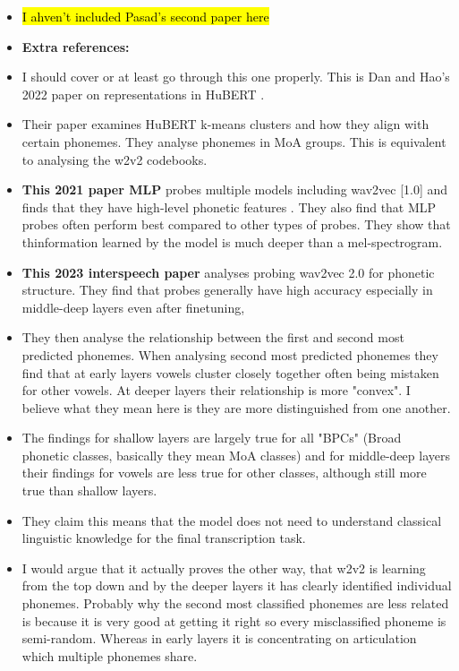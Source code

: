 \begin{itemize}
\iffalse
    \item \hl{I ahven't included Pasad's second paper here }\cite{pasad2023comparative}
    \item \textbf{Extra references:}
    \item I should cover or at least go through this one properly. This is Dan and Hao's 2022 paper on representations in HuBERT \cite{wells2022phonetic}.
    \item Their paper examines HuBERT k-means clusters and how they align with certain phonemes. They analyse phonemes in MoA groups. This is equivalent to analysing the w2v2 codebooks.
    \item \textbf{This 2021 paper MLP} probes multiple models including wav2vec [1.0] and finds that they have high-level phonetic features \cite{ma2021probing}. They also find that MLP probes often perform best compared to other types of probes. They show that thinformation learned by the model is much deeper than a mel-spectrogram.
    \item \textbf{This 2023 interspeech paper} \cite{ten2023phonemic} analyses probing wav2vec 2.0 for phonetic structure. They find that probes generally have high accuracy especially in middle-deep layers even after finetuning,
    \item They then analyse the relationship between the first and second most predicted phonemes. When analysing second most predicted phonemes they find that at early layers vowels cluster closely together often being mistaken for other vowels. At deeper layers their relationship is more "convex". I believe what they mean here is they are more distinguished from one another.
    \item The findings for shallow layers are largely true for all "BPCs" (Broad phonetic classes, basically they mean MoA classes) and for middle-deep layers their findings for vowels are less true for other classes, although still more true than shallow layers.
    \item They claim this means that the model does not need to understand classical linguistic knowledge for the final transcription task.
    \item I would argue that it actually proves the other way, that w2v2 is learning from the top down and by the deeper layers it has clearly identified individual phonemes. Probably why the second most classified phonemes are less related is because it is very good at getting it right so every misclassified phoneme is semi-random. Whereas in early layers it is concentrating on articulation which multiple phonemes share. 

\end{itemize}
